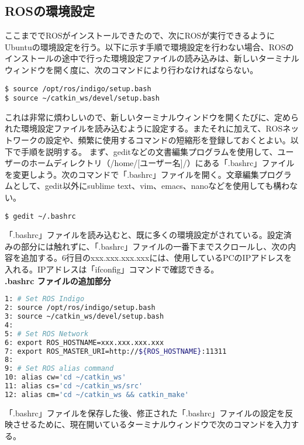 \subsection{ROSの環境設定}

ここまででROSがインストールできたので、次にROSが実行できるようにUbuntuの環境設定を行う。以下に示す手順で環境設定を行わない場合、ROSのインストールの途中で行った環境設定ファイルの読み込みは、新しいターミナルウィンドウを開く度に、次のコマンドにより行わなければならない。

\begin{lstlisting}[language=ROS]
$ source /opt/ros/indigo/setup.bash
$ source ~/catkin_ws/devel/setup.bash
\end{lstlisting}

これは非常に煩わしいので、新しいターミナルウィンドウを開くたびに、定められた環境設定ファイルを読み込むように設定する。またそれに加えて、ROSネットワークの設定や、頻繁に使用するコマンドの短縮形を登録しておくとよい。以下で手順を説明する。
まず、geditなどの文書編集プログラムを使用して、ユーザーのホームディレクトリ（/home/[ユーザー名]/）にある「.bashrc」ファイルを変更しよう。次のコマンドで「.bashrc」ファイルを開く。文章編集プログラムとして、gedit以外にsublime text、vim、emacs、nanoなどを使用しても構わない。

\begin{lstlisting}[language=ROS]
$ gedit ~/.bashrc
\end{lstlisting}

「.bashrc」ファイルを読み込むと、既に多くの環境設定がされている。設定済みの部分には触れずに、「.bashrc」ファイルの一番下までスクロールし、次の内容を追加する。6行目のxxx.xxx.xxx.xxxには、使用しているPCのIPアドレスを入れる。IPアドレスは「ifconfig」コマンドで確認できる。\\

\noindent\textbf{.bashrc ファイルの追加部分}
\begin{lstlisting}[language=bash]
1: # Set ROS Indigo
2: source /opt/ros/indigo/setup.bash
3: source ~/catkin_ws/devel/setup.bash
4:
5: # Set ROS Network
6: export ROS_HOSTNAME=xxx.xxx.xxx.xxx
7: export ROS_MASTER_URI=http://${ROS_HOSTNAME}:11311
8:
9: # Set ROS alias command
10: alias cw='cd ~/catkin_ws'
11: alias cs='cd ~/catkin_ws/src'
12: alias cm='cd ~/catkin_ws && catkin_make'
\end{lstlisting}

「.bashrc」ファイルを保存した後、修正された「.bashrc」ファイルの設定を反映させるために、現在開いているターミナルウィンドウで次のコマンドを入力する。

